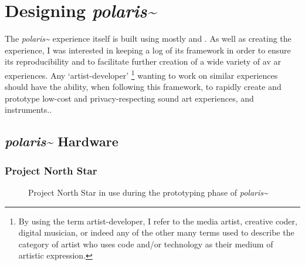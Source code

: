 \section{Designing \textit{polaris\textasciitilde{}}}\label{sec: polaris-framework}
The \textit{polaris\textasciitilde{}} experience itself is built using mostly   and . As well as creating the experience, I was interested in keeping a log of its framework in order to ensure its reproducibility and to facilitate further creation of a wide variety of \gls{av} \gls{ar} experiences. Any `artist-developer' \footnote{By using the term artist-developer, I refer to the media artist, creative coder, digital musician, or indeed any of the other many terms used to describe the category of artist who uses code and/or technology as their medium of artistic expression.} wanting to work on similar experiences should have the ability, when following this framework, to rapidly create and prototype low-cost and privacy-respecting sound \gls{art} experiences, and instruments..

\subsection{\textit{polaris\textasciitilde{}} Hardware}\label{sec: polaris-framework-hardware}
\subsubsection{Project North Star}\label{sec: polaris-framework-hardware-pns}

\begin{figure}
    \centering
    \hfill
    \caption{Project North Star in use during the prototyping phase of \textit{polaris\textasciitilde{}}}
\end{figure}

